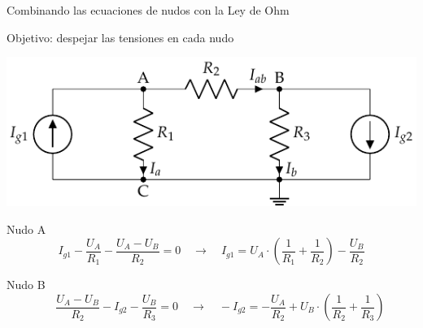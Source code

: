 \documentclass[aspectratio=169, xcolor={usenames,svgnames,dvipsnames}]{beamer}
\begin{document}
\begin{frame}{Combinando las ecuaciones de nudos con la Ley de Ohm}

    \vspace{3mm}
    \alert{Objetivo}: despejar las \alert{tensiones en cada nudo}
    
    \vspace{-2mm}
    \begin{center}
    \includegraphics[width=.7\linewidth]{../figs/nudos.pdf}
    \end{center}
    
    \vspace{-4mm}
    
    Nudo A
    \begin{equation*}
      I_{g1} - \dfrac{U_A}{R_1} - \dfrac{U_A - U_B}{R_2} = 0 \quad \rightarrow \quad I_{g1} = U_A\cdot\left(\dfrac{1}{R_1}+\dfrac{1}{R_2}\right) - \dfrac{U_B}{R_2} 
    \end{equation*}
    
    Nudo B
    \begin{equation*}
      \quad\;\; \dfrac{U_A - U_B}{R_2} - I_{g2} - \dfrac{U_B}{R_3} = 0 \quad \rightarrow \quad - I_{g2} = - \dfrac{U_A}{R_2} + U_B \cdot\left(\dfrac{1}{R_2} + \dfrac{1}{R_3}\right)
    \end{equation*}
\end{frame}

\end{document}
